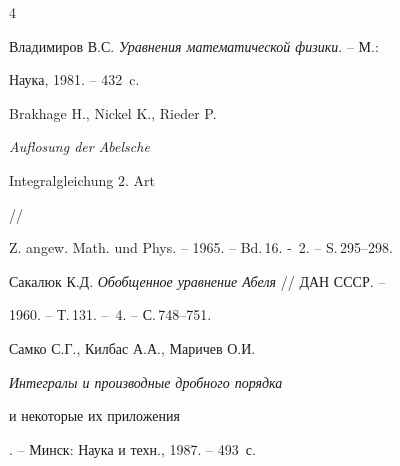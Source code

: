 \begin{thebibliography}{4}







Владимиров В.С. {\em Уравнения математической физики}. -- М.: 


Наука, 1981. -- 432~c.




Brakhage H., Nickel K., Rieder P. {\em Auflosung der Abelsche 


Integralgleichung $2$. Art} //


Z. angew. Math. und Phys. -- 1965. -- Bd.\,16. - \No\,2. -- S.\,295--298.




Сакалюк К.Д. {\em Обобщенное уравнение Абеля} // ДАН СССР. --


1960. -- Т.\,131. -- \No\,4. -- С.\,748--751.




Самко С.Г., Килбас А.А., Маричев О.И.


{\em Интегралы и производные дробного порядка


и некоторые их приложения}. -- Минск: Наука и техн., 1987. -- 493~с.





\end{thebibliography}





\vskip 2cm







\smallskip









\label{end}





